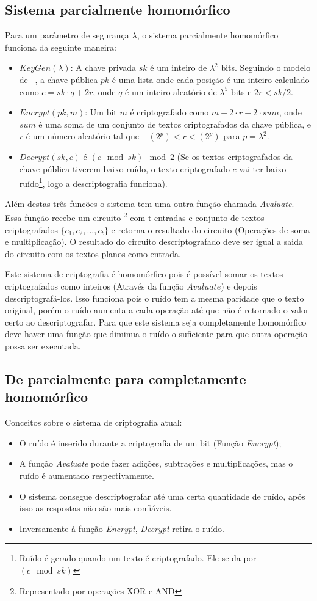 \subsection{Sistema parcialmente homomórfico}
Para um parâmetro de segurança $\lambda$, o sistema parcialmente homomórfico funciona da seguinte maneira:
\begin{itemize}
	\item $KeyGen(\lambda)$: A chave privada $sk$ é um inteiro de $\lambda^2$  bits. Seguindo o modelo de ~\cite{rothblum}, a chave pública $pk$ é uma lista onde cada posição é um inteiro calculado como $c = sk \cdot q + 2r$, onde $q$ é um inteiro aleatório de $\lambda^5$ bits e $2r < sk/2$.
	\item $Encrypt(pk,m)$: Um bit $m$ é criptografado como $m + 2 \cdot r + 2 \cdot sum$, onde $sum$ é uma soma de um conjunto de textos criptografados da chave pública, e $r$ é um número aleatório tal que $-(2^p) < r < (2^p)$ para $p =  \lambda^2$.
	\item $Decrypt(sk,c)$ é $(c \mod sk) \mod 2$ (Se os textos criptografados da chave pública tiverem baixo ruído, o texto criptografado $c$ vai ter baixo ruído\footnote{Ruído é gerado quando um texto é criptografado. Ele se da por $(c \mod sk)$}, logo a descriptografia funciona).
\end{itemize}
Além destas três funcões o sistema tem uma outra função chamada \textit{Avaluate}. Essa função recebe um circuito \footnote{Representado por operações XOR e AND} com t entradas e conjunto de textos criptografados $\lbrace c_1,c_2,...,c_t \rbrace$ e retorna o resultado do circuito (Operações de soma e multiplicação). O resultado do circuito descriptografado deve ser igual a saida do circuito com os textos planos como entrada.

Este sistema de criptografia é homomórfico pois é possível somar os textos criptografados como inteiros (Através da função $Avaluate$) e depois descriptografá-los. Isso funciona pois o ruído tem a mesma paridade que o texto original, porém o ruído aumenta a cada operação até que não é retornado o valor certo ao descriptografar.
Para que este sistema seja completamente homomórfico deve haver uma função que diminua o ruído o suficiente para que outra operação possa ser executada.

\subsection{De parcialmente para completamente homomórfico}
Conceitos sobre o sistema de criptografia atual:
\begin{itemize}
	\item O ruído é inserido durante a criptografia de um bit (Função \textit{Encrypt});
	\item A função \textit{Avaluate} pode fazer adições, subtrações e multiplicações, mas o ruído é aumentado respectivamente.
	\item O sistema consegue descriptografar até uma certa quantidade de ruído, após isso as respostas não são mais confiáveis.
	\item Inversamente à função \textit{Encrypt}, \textit{Decrypt} retira o ruído.
\end{itemize}
  
